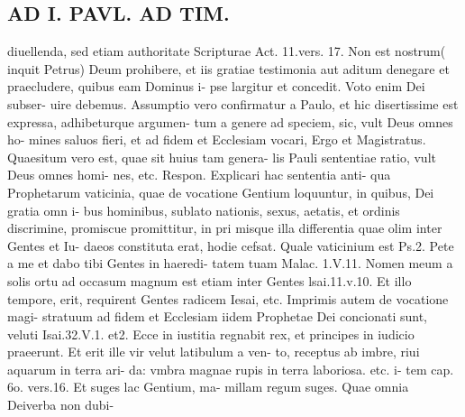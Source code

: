 \documentclass{article}
\begin{document}
\begin{pages}
\section*{AD I. PAVL. AD TIM. }
\marginpar{[ p.52 ]}\pstart diuellenda, sed etiam authoritate Scripturae Act. 11.vers. 17. Non est nostrum( inquit Petrus) Deum prohibere, et iis gratiae testimonia aut aditum denegare et praecludere, quibus eam Dominus i- pse largitur et concedit. Voto enim Dei subser- uire debemus. Assumptio vero confirmatur a Paulo, et hic disertissime est expressa, adhibeturque argumen- tum a genere ad speciem, sic, vult Deus omnes ho- mines saluos fieri, et ad fidem et Ecclesiam vocari, Ergo et Magistratus. Quaesitum vero est, quae sit huius tam genera- lis Pauli sententiae ratio, vult Deus omnes homi- nes, etc. Respon. Explicari hac sententia anti- qua Prophetarum vaticinia, quae de vocatione Gentium loquuntur, in quibus, Dei gratia omn i- bus hominibus, sublato nationis, sexus, aetatis, et ordinis discrimine, promiscue promittitur, in pri misque illa differentia quae olim inter Gentes et Iu- daeos constituta erat, hodie cefsat. Quale vaticinium est Ps.2. Pete a me et dabo tibi Gentes in haeredi- tatem tuam Malac. 1.V.11. Nomen meum a solis ortu ad occasum magnum est etiam inter Gentes lsai.11.v.10. Et illo tempore, erit, requirent Gentes radicem Iesai, etc. Imprimis autem de vocatione magi- stratuum ad fidem et Ecclesiam iidem Prophetae Dei concionati sunt, veluti Isai.32.V.1. et2. Ecce in iustitia regnabit rex, et principes in iudicio praeerunt. Et erit ille vir velut latibulum a ven- to, receptus ab imbre, riui aquarum in terra ari- da: vmbra magnae rupis in terra laboriosa. etc. i- tem cap. 6o. vers.16. Et suges lac Gentium, ma- millam regum suges. Quae omnia Deiverba non dubi-  \pend

\end{pages}
\end{document}
